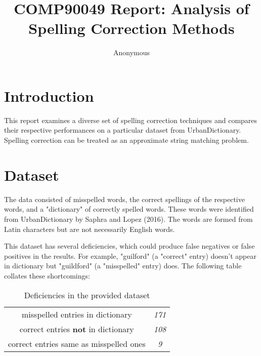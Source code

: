 \documentclass[11pt]{article}
\title{COMP90049 Report: Analysis of Spelling Correction Methods}
\author
{Anonymous}
\begin{document}
\maketitle



\section{Introduction}

This report examines a diverse set of spelling correction techniques and compares their respective performances on a particular dataset from UrbanDictionary. %
Spelling correction can be treated as an approximate string matching problem. %




\section{Dataset}
The data consisted of misspelled words, the correct spellings of the respective words, and a "dictionary" of correctly spelled words. These words were identified from UrbanDictionary by Saphra and Lopez (2016). The words are formed from Latin characters but are not necessarily English words. 

This dataset has several deficiencies, which could produce false negatives or false positives in the results. For example, "guilford" (a "correct" entry) doesn't appear in dictionary but "guildford" (a "misspelled" entry) does. The following table collates these shortcomings:


\begin{table}[h]
\begin{center}
\begin{tabular}{|c|c|}

\hline
misspelled entries in dictionary & \textit{171}  \\ 
correct entries \textbf{not} in dictionary & \textit{108} \\ 
correct entries same as misspelled ones & \textit{9} \\
\hline

\end{tabular}
\caption{Deficiencies in the provided dataset}\label{deficiencies}
 \end{center}
\end{table}
\end{document}
